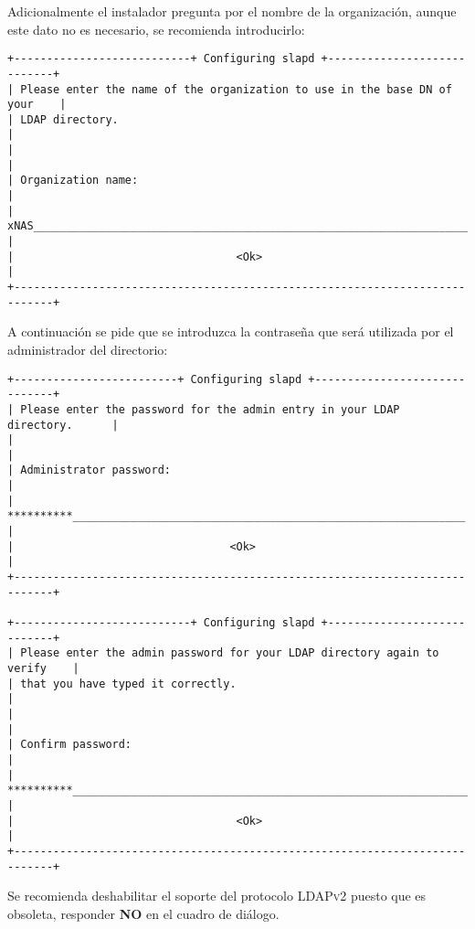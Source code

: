 Adicionalmente el instalador pregunta por el nombre de la organizaci\'{o}n, aunque este dato no es necesario, se recomienda introducirlo:

{
\scriptsize
\linespread{1}
\begin{verbatim}
+---------------------------+ Configuring slapd +----------------------------+
| Please enter the name of the organization to use in the base DN of your    |
| LDAP directory.                                                            |
|                                                                            |
| Organization name:                                                         |
| xNAS_____________________________________________________________________  |
|                                  <Ok>                                      |
+----------------------------------------------------------------------------+
\end{verbatim}
}

A continuaci\'{o}n se pide que se introduzca la contrase\~{n}a que ser\'{a} utilizada por el administrador del directorio:

{
\scriptsize
\linespread{1}
\begin{verbatim}
+-------------------------+ Configuring slapd +------------------------------+
| Please enter the password for the admin entry in your LDAP directory.      |
|                                                                            |
| Administrator password:                                                    |
| **********____________________________________________________________     |
|                                 <Ok>                                       |
+----------------------------------------------------------------------------+

+---------------------------+ Configuring slapd +----------------------------+
| Please enter the admin password for your LDAP directory again to verify    |
| that you have typed it correctly.                                          |
|                                                                            |
| Confirm password:                                                          |
| **********_______________________________________________________________  |
|                                  <Ok>                                      |
+----------------------------------------------------------------------------+
\end{verbatim}
}

Se recomienda deshabilitar el soporte del protocolo \textsc{LDAPv2} puesto que es obsoleta, responder \textbf{NO} en el cuadro de di\'{a}logo.

